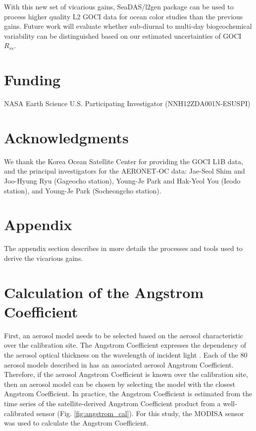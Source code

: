 \documentclass[10pt]{article}
\begin{document}
With this new set of vicarious gains, SeaDAS/l2gen package can be used to process higher quality L2 GOCI data for ocean color studies than the previous gains. Future work will evaluate whether sub-diurnal to multi-day biogeochemical variability can be distinguished based on our estimated uncertainties of GOCI $R_{rs}$. 

\section*{Funding}
NASA Earth Science U.S. Participating Investigator (NNH12ZDA001N-ESUSPI) 
\section*{Acknowledgments}
We thank the Korea Ocean Satellite Center for providing the GOCI L1B data, and the principal investigators for the AERONET-OC data: Jae-Seol Shim and Joo-Hyung Ryu (Gageocho station), Young-Je Park and Hak-Yeol You (Ieodo station), and Young-Je Park (Socheongcho station). 


\appendix
\section*{Appendix}
The appendix section describes in more details the processes and tools used to derive the vicarious gains.

\section{Calculation of the Angstrom Coefficient}\label{sec:appendix_Angstrom}
First, an aerosol model needs to be selected based on the aerosol characteristic over the calibration site. The Angstrom Coefficient expresses the dependency of the aerosol optical thickness on the wavelength of incident light \cite{Wang:2005}. Each of the 80 aerosol models described in \cite{Ahmad2010} has an associated aerosol Angstrom Coefficient. Therefore, if the aerosol Angstrom Coefficient is known over the calibration site, then an aerosol model can be chosen by selecting the model with the closest Angstrom Coefficient. In practice, the Angstrom Coefficient is estimated from the time series of the satellite-derived Angstrom Coefficient product from a well-calibrated sensor (Fig. \ref{fig:angstrom_cal}). For this study, the MODISA sensor was used to calculate the Angstrom Coefficient.
\end{document}
